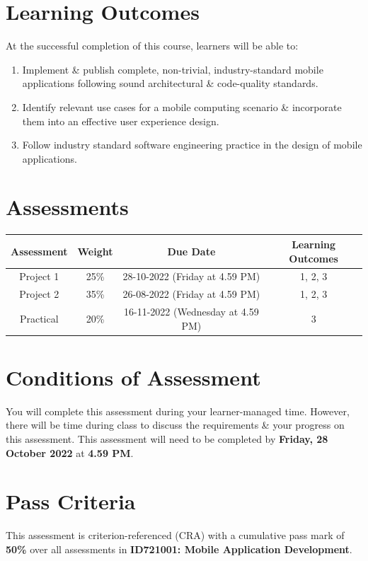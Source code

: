 \documentclass{article}
\begin{document}
\section*{Learning Outcomes}
At the successful completion of this course, learners will be able to:
\begin{enumerate}
	\item Implement \& publish complete, non-trivial, industry-standard mobile applications following sound architectural \& code-quality standards.
	\item Identify relevant use cases for a mobile computing scenario \& incorporate them into an effective user experience design.
	\item Follow industry standard software engineering practice in the design of mobile applications.
\end{enumerate}

\section*{Assessments}
\renewcommand{\arraystretch}{1.5}
\begin{tabular}{|c|c|c|c|}
	\hline
	\textbf{Assessment} & \textbf{Weight} & \textbf{Due Date}    & \textbf{Learning Outcomes} \\ \hline
	Project 1            & 25\%            & 28-10-2022 (Friday at 4.59 PM)  & 1, 2, 3                    \\ \hline
	Project 2         & 35\%            & 26-08-2022 (Friday at 4.59 PM) & 1, 2, 3                    \\ \hline
	Practical       & 20\%            & 16-11-2022 (Wednesday at 4.59 PM) & 3                       \\ \hline
\end{tabular}

\section*{Conditions of Assessment}
You will complete this assessment during your learner-managed time. However, there will be time during class to discuss the requirements \& your progress on this assessment. This assessment will need to be completed by \textbf{Friday, 28 October 2022} at \textbf{4.59 PM}.

\section*{Pass Criteria}
This assessment is criterion-referenced (CRA) with a cumulative pass mark of \textbf{50\%} over all assessments in \textbf{ID721001: Mobile Application Development}.
\end{document}
